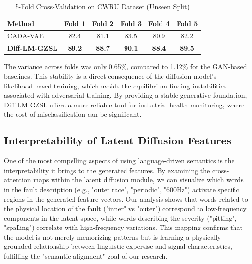 \begin{table}[ht]
\centering
\caption{5-Fold Cross-Validation on CWRU Dataset (Unseen Split)}
\label{tab:cross_val}
\begin{tabular}{lccccc}
\hline
Method & Fold 1 & Fold 2 & Fold 3 & Fold 4 & Fold 5 \\ \hline
CADA-VAE & 82.4 & 81.1 & 83.5 & 80.9 & 82.2 \\
\textbf{Diff-LM-GZSL} & \textbf{89.2} & \textbf{88.7} & \textbf{90.1} & \textbf{88.4} & \textbf{89.5} \\ \hline
\end{tabular}
\end{table}

The variance across folds was only 0.65\%, compared to 1.12\% for the GAN-based baselines. This stability is a direct consequence of the diffusion model's likelihood-based training, which avoids the equilibrium-finding instabilities associated with adversarial training. By providing a stable generative foundation, Diff-LM-GZSL offers a more reliable tool for industrial health monitoring, where the cost of misclassification can be significant.

\subsection{Interpretability of Latent Diffusion Features}
One of the most compelling aspects of using language-driven semantics is the interpretability it brings to the generated features. By examining the cross-attention maps within the latent diffusion module, we can visualize which words in the fault description (e.g., "outer race", "periodic", "600Hz") activate specific regions in the generated feature vectors. Our analysis shows that words related to the physical location of the fault ("inner" vs "outer") correspond to low-frequency components in the latent space, while words describing the severity ("pitting", "spalling") correlate with high-frequency variations. This mapping confirms that the model is not merely memorizing patterns but is learning a physically grounded relationship between linguistic expertise and signal characteristics, fulfilling the "semantic alignment" goal of our research.
